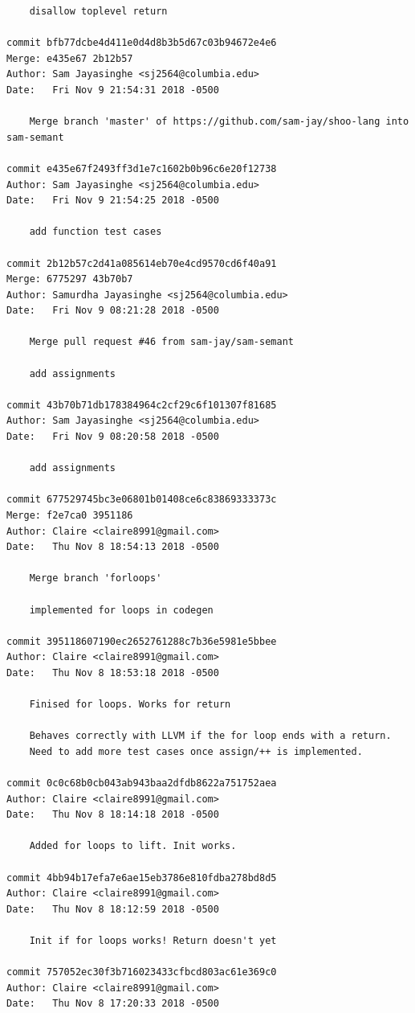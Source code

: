 \documentclass[12pt]{article}
\begin{document}
\begin{lstlisting}
    disallow toplevel return

commit bfb77dcbe4d411e0d4d8b3b5d67c03b94672e4e6
Merge: e435e67 2b12b57
Author: Sam Jayasinghe <sj2564@columbia.edu>
Date:   Fri Nov 9 21:54:31 2018 -0500

    Merge branch 'master' of https://github.com/sam-jay/shoo-lang into sam-semant

commit e435e67f2493ff3d1e7c1602b0b96c6e20f12738
Author: Sam Jayasinghe <sj2564@columbia.edu>
Date:   Fri Nov 9 21:54:25 2018 -0500

    add function test cases

commit 2b12b57c2d41a085614eb70e4cd9570cd6f40a91
Merge: 6775297 43b70b7
Author: Samurdha Jayasinghe <sj2564@columbia.edu>
Date:   Fri Nov 9 08:21:28 2018 -0500

    Merge pull request #46 from sam-jay/sam-semant
    
    add assignments

commit 43b70b71db178384964c2cf29c6f101307f81685
Author: Sam Jayasinghe <sj2564@columbia.edu>
Date:   Fri Nov 9 08:20:58 2018 -0500

    add assignments

commit 677529745bc3e06801b01408ce6c83869333373c
Merge: f2e7ca0 3951186
Author: Claire <claire8991@gmail.com>
Date:   Thu Nov 8 18:54:13 2018 -0500

    Merge branch 'forloops'
    
    implemented for loops in codegen

commit 395118607190ec2652761288c7b36e5981e5bbee
Author: Claire <claire8991@gmail.com>
Date:   Thu Nov 8 18:53:18 2018 -0500

    Finised for loops. Works for return
    
    Behaves correctly with LLVM if the for loop ends with a return.
    Need to add more test cases once assign/++ is implemented.

commit 0c0c68b0cb043ab943baa2dfdb8622a751752aea
Author: Claire <claire8991@gmail.com>
Date:   Thu Nov 8 18:14:18 2018 -0500

    Added for loops to lift. Init works.

commit 4bb94b17efa7e6ae15eb3786e810fdba278bd8d5
Author: Claire <claire8991@gmail.com>
Date:   Thu Nov 8 18:12:59 2018 -0500

    Init if for loops works! Return doesn't yet

commit 757052ec30f3b716023433cfbcd803ac61e369c0
Author: Claire <claire8991@gmail.com>
Date:   Thu Nov 8 17:20:33 2018 -0500


\end{lstlisting}
\end{document}
